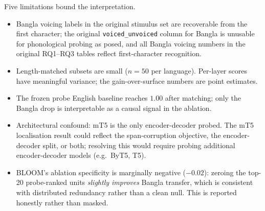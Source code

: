 Five limitations bound the interpretation.

\begin{itemize}
    \item Bangla voicing labels in the original stimulus set are recoverable from the first character; the original \texttt{voiced\_unvoiced} column for Bangla is unusable for phonological probing as posed, and all Bangla voicing numbers in the original RQ1--RQ3 tables reflect first-character recognition.
    \item Length-matched subsets are small ($n = 50$ per language). Per-layer scores have meaningful variance; the gain-over-surface numbers are point estimates.
    \item The frozen probe English baseline reaches $1.00$ after matching; only the Bangla drop is interpretable as a causal signal in the ablation.
    \item Architectural confound: mT5 is the only encoder-decoder probed. The mT5 localisation result could reflect the span-corruption objective, the encoder-decoder split, or both; resolving this would require probing additional encoder-decoder models (e.g.\ ByT5, T5).
    \item BLOOM's ablation specificity is marginally negative ($-0.02$): zeroing the top-20 probe-ranked units \emph{slightly improves} Bangla transfer, which is consistent with distributed redundancy rather than a clean null. This is reported honestly rather than masked.
\end{itemize}
